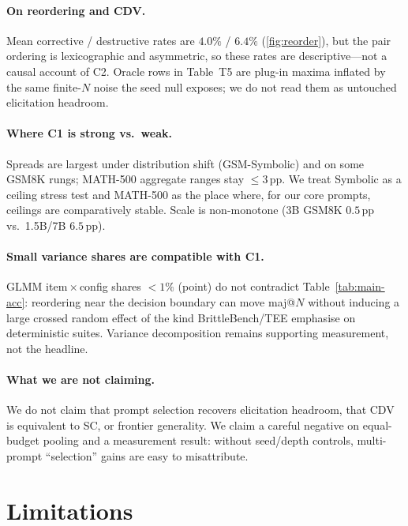 \documentclass{article}
\theoremstyle{plain}
\theoremstyle{definition}
\theoremstyle{remark}
\begin{document}
\paragraph{On reordering and CDV.}
Mean corrective / destructive rates are $4.0\%$ / $6.4\%$
(\cref{fig:reorder}), but the pair ordering is lexicographic and asymmetric, so
these rates are descriptive---not a causal account of C2. Oracle rows in
Table~T5 are plug-in maxima inflated by the same finite-$N$ noise the seed null
exposes; we do not read them as untouched elicitation headroom.

\paragraph{Where C1 is strong vs.\ weak.}
Spreads are largest under distribution shift (GSM-Symbolic) and on some GSM8K
rungs; MATH-500 aggregate ranges stay $\le 3$\,pp. We treat Symbolic as a
ceiling stress test and MATH-500 as the place where, for our core prompts,
ceilings are comparatively stable. Scale is non-monotone (3B GSM8K $0.5$\,pp
vs.\ 1.5B/7B $6.5$\,pp).

\paragraph{Small variance shares are compatible with C1.}
GLMM item\,$\times$\,config shares ${<}1\%$ (point) do not contradict
Table~\ref{tab:main-acc}: reordering near the decision boundary can move maj@$N$
without inducing a large crossed random effect of the kind BrittleBench/TEE
emphasise on deterministic suites. Variance decomposition remains supporting
measurement, not the headline.

\paragraph{What we are not claiming.}
We do not claim that prompt selection recovers elicitation headroom, that CDV
is equivalent to SC, or frontier generality. We claim a careful negative on
equal-budget pooling and a measurement result: without seed/depth controls,
multi-prompt ``selection'' gains are easy to misattribute.

\section{Limitations}
\label{sec:limitations}
\end{document}
